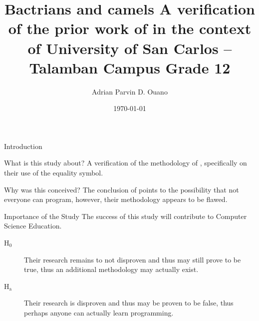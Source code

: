 \documentclass[presentation]{beamer}
\author{Adrian Parvin D. Ouano}
\date{\today}
\title{Bactrians and camels A verification of the prior work of \cite{dehnadi2006camel} in the context of University of San Carlos -- Talamban Campus Grade 12}
\begin{document}
\maketitle

\begin{frame}[label={sec:org8527f9c}]{Introduction}
\begin{block}{What is this study about?}
A verification of the methodology of \cite{dehnadi2006camel}, 
specifically on their use of the equality symbol.
\end{block}

\begin{block}{Why was this conceived?}
The conclusion of \cite{dehnadi2006camel} points to the possibility that not everyone can program,
however, their methodology appears to be flawed.
\end{block}
\end{frame}

\begin{frame}[label={sec:orgb13927a}]{Importance of the Study}
The success of this study will contribute to Computer Science Education.

\begin{description}
\item[{H\(_{\text{0}}\)}] Their research remains to not disproven and thus may still
prove to be true, thus an additional methodology may actually
exist.
\item[{H\(_{\text{a}}\)}] Their research is disproven and thus may be proven to be
false, thus perhaps anyone can actually learn programming.
\end{description}
\end{frame}
\end{document}
